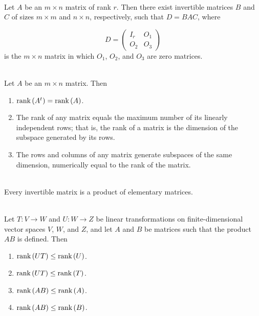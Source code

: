 \begin{corollary}
	\hfill\\
	Let $A$ be an $m \times n$ matrix of rank $r$. Then there exist invertible matrices $B$ and $C$ of sizes $m \times m$ and $n \times n$, respectively, such that $D=BAC$, where

	\[D = \begin{pmatrix}
			I_r & O_1 \\
			O_2 & O_3
		\end{pmatrix}\]
	is the $m \times n$ matrix in which $O_1$, $O_2$, and $O_3$ are zero matrices.
\end{corollary}

\begin{corollary}
	\hfill\\
	Let $A$ be an $m \times n$ matrix. Then

	\begin{enumerate}
		\item $\text{rank}\left(A^t\right) = \text{rank}\left(A\right)$.
		\item The rank of any matrix equals the maximum number of its linearly independent rows; that is, the rank of a matrix is the dimension of the subspace generated by its rows.
		\item The rows and columns of any matrix generate subspaces of the same dimension, numerically equal to the rank of the matrix.
	\end{enumerate}
\end{corollary}

\begin{corollary}
	\hfill\\
	Every invertible matrix is a product of elementary matrices.
\end{corollary}

\begin{theorem}
	\hfill\\
	Let $T: V \to W$ and $U: W \to Z$ be linear transformations on finite-dimensional vector spaces $V$, $W$, and $Z$, and let $A$ and $B$ be matrices such that the product $AB$ is defined. Then

	\begin{enumerate}
		\item $\text{rank}\left(UT\right) \leq \text{rank}\left(U\right)$.
		\item $\text{rank}\left(UT\right) \leq \text{rank}\left(T\right)$.
		\item $\text{rank}\left(AB\right) \leq \text{rank}\left(A\right)$.
		\item $\text{rank}\left(AB\right) \leq \text{rank}\left(B\right)$.
	\end{enumerate}
\end{theorem}

